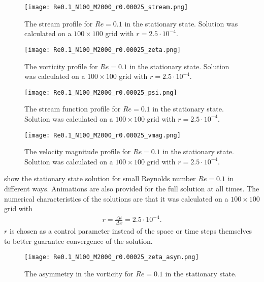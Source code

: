 \documentclass[10pt,a4paper,twocolumn]{article}
\begin{document}
\begin{figure}[!h]
    \centering
    \texttt{[image: Re0.1\_N100\_M2000\_r0.00025\_stream.png]}
    \caption{The stream profile for $Re=0.1$ in the stationary state. Solution was calculated on a $100 \times 100$ grid with $r=2.5 \cdot 10^{-4}$.}
    \label{fig:Re0.1_stream}
\end{figure}

\begin{figure}[!h]
    \centering
    \texttt{[image: Re0.1\_N100\_M2000\_r0.00025\_zeta.png]}
    \caption{The vorticity profile for $Re=0.1$ in the stationary state. Solution was calculated on a $100 \times 100$ grid with $r=2.5 \cdot 10^{-4}$.}
    \label{fig:Re0.1_zeta}
\end{figure}

\begin{figure}[!h]
    \centering
    \texttt{[image: Re0.1\_N100\_M2000\_r0.00025\_psi.png]}
    \caption{The stream function profile for $Re=0.1$ in the stationary state. Solution was calculated on a $100 \times 100$ grid with $r=2.5 \cdot 10^{-4}$.}
    \label{fig:Re0.1_psi}
\end{figure}

\clearpage
\newpage

\begin{figure}[!h]
    \centering
    \texttt{[image: Re0.1\_N100\_M2000\_r0.00025\_vmag.png]}
    \caption{The velocity magnitude profile for $Re=0.1$ in the stationary state. Solution was calculated on a $100 \times 100$ grid with $r=2.5 \cdot 10^{-4}$.}
    \label{fig:Re0.1_vmag}
\end{figure}

 show the stationary state solution for small Reynolds number $Re=0.1$ in different ways. Animations are also provided for the full solution at all times. The numerical characteristics of the solutions are that it was calculated on a $100 \times 100$ grid with
%
\begin{align}
    r = \frac{\Delta t}{\Delta x} = 2.5 \cdot 10^{-4}.
\end{align} 
%
$r$ is chosen as a control parameter instead of the space or time steps themselves to better guarantee convergence of the solution.

\begin{figure}[!h]
    \centering
    \texttt{[image: Re0.1\_N100\_M2000\_r0.00025\_zeta\_asym.png]}
    \caption{The asymmetry in the vorticity for $Re=0.1$ in the stationary state.}
    \label{fig:Re0.1_zeta_asym}
\end{figure}
\end{document}
